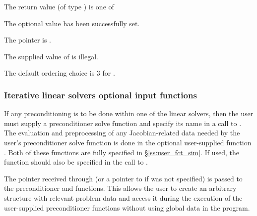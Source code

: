 {
  The return value  (of type ) is one of
  \begin{args}
  \item[\Id{CVSLS\_SUCCESS}] 
    The optional value has been successfully set.
  \item[\Id{CVSLS\_MEM\_NULL}]
    The  pointer is .
  \item[\Id{CVSLS\_ILL\_INPUT}]
    The supplied value of  is illegal.
  \end{args}
}
{
  The default ordering choice is 3 for .
}


\subsubsection{Iterative linear solvers optional input functions}\label{sss:optin_spils}
If any preconditioning is to be done within one of the {\cvspils} linear
solvers, then the user must supply a preconditioner solve function 
and specify its name in a call to .
The evaluation and preprocessing of any Jacobian-related data needed
by the user's preconditioner solve function is done in the optional
user-supplied function . Both of these functions are
fully specified in \S\ref{ss:user_fct_sim}.
If used, the  function should also be specified in the call to
.

The pointer  received through  (or a pointer to 
if  was not specified) 
is passed to the preconditioner  and  functions.  
This allows the user to create an arbitrary structure with relevant problem data 
and access it during the execution of the user-supplied preconditioner functions
without using global data in the program.  

